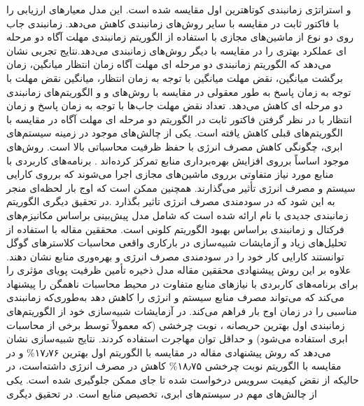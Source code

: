  و استراتژی زمانبندی کوتاهترین اول 
  مقایسه شده است. این مدل معیارهای ارزیابی را با فاکتور ثابت در مقایسه با سایر روش‌های زمانبندی کاهش می‌دهد. زمانبندی 
   جاب روی دو نوع از ماشین‌های مجازی با استفاده از الگوریتم زمانبندی مهلت آگاه دو مرحله ای عملکرد بهتری را در مقایسه با دیگر روش‌های زمانبندی می‌دهد.نتایج تجربی نشان می‌دهد که الگوریتم زمانبندی دو مرحله ای مهلت آگاه زمان انتظار میانگین، زمان برگشت میانگین، نقض مهلت میانگین با توجه به زمان انتظار، میانگین نقض مهلت با توجه به زمان پاسخ به طور معقولی در مقایسه با روش‌های 
   و
    و الگوریتم‌های زمانبندی دو مرحله ای کاهش می‌دهد. تعداد نقض مهلت جاب‌ها با توجه به زمان پاسخ و زمان انتظار با در نظر گرفتن فاکتور ثابت در الگوریتم دو مرحله ای مهلت آگاه در مقایسه با الگوریتم‌های قبلی کاهش یافته است.
 یکی از چالش‌های موجود در زمینه سیستم‌های ابری، چگونگی کاهش مصرف انرژی با حفظ ظرفیت محاسباتی بالا است. روش‌های موجود اساساً برروی افزایش بهره‌برداری منابع تمرکز کرده‌اند . برنامه‌های کاربردی با منابع مورد نیاز متفاوتی برروی ماشین‌های مجازی اجرا می‌شوند که برروی کارایی سیستم و مصرف انرژی تأثیر می‌گذارند. همچنین ممکن است که اوج بار
  لحظه‌ای منجر به این شود  که در سودمندی مصرف انرژی تاثیر بگذارد .در تحقیق دیگری
\cite{num14}
  الگوریتم زمانبندی جدیدی با نام
  ارائه شده است که شامل مدل پیش‌بینی بر‌اساس مکانیزم‌های فرکتال
  و
   زمانبندی براساس بهبود الگوریتم کلونی است.  محققین مقاله با استفاده از تحلیل‌های زیاد و آزمایشات شبیه‌سازی در بارکاری واقعی محاسبات کلاسترهای گوگل توانستند کارایی کار خود را در سودمندی مصرف انرژی و بهره‌وری منابع نشان دهند. علاوه بر این روش پیشنهادی محققین مقاله مدل ذخیره تأمین ظرفیت پویای مؤثری را برای برنامه‌های کاربردی با نیازهای منابع متفاوت در محیط محاسبات ناهمگن را پیشنهاد می‌کند که می‌تواند مصرف منابع سیستم و انرژی را کاهش دهد به‌طوری‌که زمانبندی مناسبی را در زمان اوج بار فراهم می‌کند.  در آزمایشات شبیه‌سازی خود از الگوریتم‌های زمانبندی اول بهترین حریصانه
   ،
    نوبت چرخشی
     (که معمولاً توسط برخی از محاسبات ابری استفاده می‌شود)  و حداقل توان مهاجرت استفاده کردند. نتایج شبیه‌سازی نشان می‌دهد که روش پیشنهادی مقاله در مقایسه با الگوریتم اول بهترین
۱۷٫۷۶\%
     و در مقایسه با الگوریتم نوبت چرخشی
۱۸٫۷۵\%
     کاهش در مصرف انرژی داشته‌است، در حالیکه از نقض کیفیت سرویس درخواست شده تا جای ممکن جلوگیری شده است.
یکی از چالش‌های مهم در سیستم‌های ابری، تخصیص منابع است. در تحقیق دیگری 
\cite{num15}
